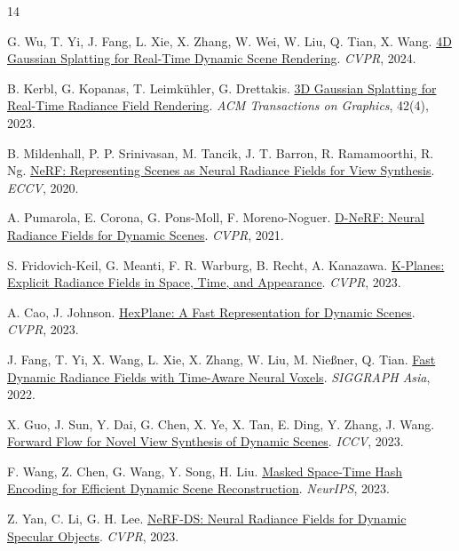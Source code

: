 \documentclass[a4paper]{report}
\begin{document}
\begin{thebibliography}{14}
{}

G. Wu, T. Yi, J. Fang, L. Xie, X. Zhang, W. Wei, W. Liu, Q. Tian, X. Wang.
\href{https://arxiv.org/pdf/2310.08528}{4D Gaussian Splatting for Real-Time Dynamic Scene Rendering}.
\textit{CVPR}, 2024.

B. Kerbl, G. Kopanas, T. Leimkühler, G. Drettakis.
\href{https://arxiv.org/pdf/2308.04079}{3D Gaussian Splatting for Real-Time Radiance Field Rendering}.
\textit{ACM Transactions on Graphics}, 42(4), 2023.

B. Mildenhall, P. P. Srinivasan, M. Tancik, J. T. Barron, R. Ramamoorthi, R. Ng.
\href{https://arxiv.org/pdf/2003.08934}{NeRF: Representing Scenes as Neural Radiance Fields for View Synthesis}.
\textit{ECCV}, 2020.

A. Pumarola, E. Corona, G. Pons-Moll, F. Moreno-Noguer.
\href{https://arxiv.org/pdf/2011.13961}{D-NeRF: Neural Radiance Fields for Dynamic Scenes}.
\textit{CVPR}, 2021.

S. Fridovich-Keil, G. Meanti, F. R. Warburg, B. Recht, A. Kanazawa.
\href{https://arxiv.org/pdf/2301.10241}{K-Planes: Explicit Radiance Fields in Space, Time, and Appearance}.
\textit{CVPR}, 2023.

A. Cao, J. Johnson.
\href{https://arxiv.org/pdf/2301.09632}{HexPlane: A Fast Representation for Dynamic Scenes}.
\textit{CVPR}, 2023.

J. Fang, T. Yi, X. Wang, L. Xie, X. Zhang, W. Liu, M. Nießner, Q. Tian.
\href{https://arxiv.org/pdf/2205.15285}{Fast Dynamic Radiance Fields with Time-Aware Neural Voxels}.
\textit{SIGGRAPH Asia}, 2022.

X. Guo, J. Sun, Y. Dai, G. Chen, X. Ye, X. Tan, E. Ding, Y. Zhang, J. Wang.
\href{https://arxiv.org/pdf/2309.17390}{Forward Flow for Novel View Synthesis of Dynamic Scenes}.
\textit{ICCV}, 2023.

F. Wang, Z. Chen, G. Wang, Y. Song, H. Liu.
\href{https://arxiv.org/pdf/2310.17527}{Masked Space-Time Hash Encoding for Efficient Dynamic Scene Reconstruction}.
\textit{NeurIPS}, 2023.

Z. Yan, C. Li, G. H. Lee.
\href{https://arxiv.org/pdf/2303.14435}{NeRF-DS: Neural Radiance Fields for Dynamic Specular Objects}.
\textit{CVPR}, 2023.


\end{thebibliography}
\end{document}
